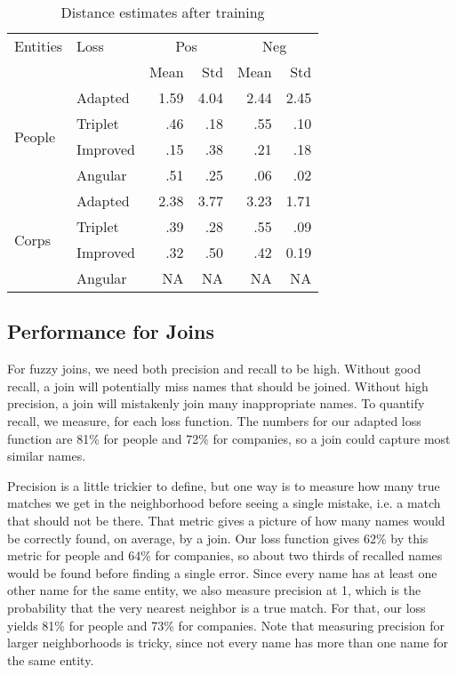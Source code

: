 \begin{table}[ht]
\caption{Distance estimates after training}
\label{Evaluation}
\begin{center}
{\scriptsize 
\begin{tabular}{l|l|r|r|r|r|}
\hline
Entities & Loss & \multicolumn{2}{|c|}{Pos} & \multicolumn{2}{|c}{Neg} \\
& & Mean & Std & Mean & Std \\
\hline
\multirow{4}{*}{People} & Adapted & 1.59 & 4.04 & 2.44 & 2.45 \\
\cline{2-6}
& Triplet & .46 & .18 & .55 & .10 \\
\cline{2-6}
& Improved & .15 & .38 & .21 & .18 \\
\cline{2-6}
& Angular & .51 & .25 & .06 & .02 \\
\hline
\multirow{4}{*}{Corps} & Adapted & 2.38 & 3.77 & 3.23 & 1.71 \\
\cline{2-6}
& Triplet & .39 & .28 & .55 & .09 \\
\cline{2-6}
& Improved & .32 & .50 & .42 & 0.19 \\
\cline{2-6}
& Angular & NA & NA & NA & NA \\
\hline
\end{tabular}}
\end{center}
\end{table}


\subsection{Performance for Joins}

 For fuzzy joins, we need both precision and recall to be high.  Without good recall, a join will potentially miss names that should be joined.  Without high precision, a join will mistakenly join many inappropriate names.  To quantify recall, we measure, for each loss function.  The numbers for our adapted loss function are 81\% for people and 72\% for companies, so a join could capture most similar names.

 Precision is a little trickier to define, but one way is to measure how many true matches we get in the neighborhood before seeing a single mistake, i.e. a match that should not be there.  That metric gives a picture of how many names would be correctly found, on average, by a join.  Our loss function gives 62\% by this metric for people and 64\% for companies, so about two thirds of recalled names would be found before finding a single error.  Since every name has at least one other name for the same entity, we also measure precision at 1, which is the probability that the very nearest neighbor is a true match.  For that, our loss yields 81\% for people and 73\% for companies.  Note that measuring precision for larger neighborhoods is tricky, since not every name has more than one name for the same entity.

